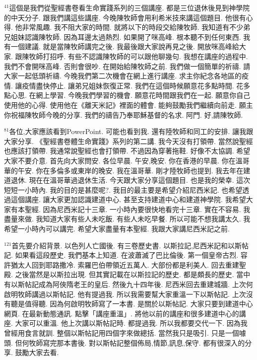 \documentclass{book}
\begin{document}
$^{41}$這個是我們從聖經書卷看生命實踐系列的三個講座.
都是三位退休後見到神學院的中天分子.
跟我們講這些講座.
今晚陳牧師會用利希米技來講這個題目.
他很有心得.
他非常風趣.
我不阻大家的時間.
就將以下的時段交給陳牧師.
我知道有不少弟兄姐妹認識陳牧師.
因為耳邊太過熱烈.
如果開了咪高峰.
根本聽不到任何東西.
我有一個建議.
就是當陳牧師講完之後.
我最後跟大家說再見之後.
開放咪高峰給大家.
跟陳牧師打招呼.
有些不認識陳牧師的可以跟他聊幾句.
我想在講座的過程中.
我們不會開咪高峰.
否則會很吵.
在開始給陳牧師之前.
我們做一個簡單的祈禱.
請大家一起低頭祈禱.
今晚我們第二次機會在網上進行講座.
求主你紀念各地區的疫情.
讓疫情盡快停止.
讓弟兄姐妹恢復正常.
我們在這個時候願意花多點時間.
花多點心思.
在網上學習.
今晚我們學習的機會.
願意花時間跟我們在一起.
願意你自己使用他的心得.
使用他在《離天米記》裡面的體會.
能夠鼓勵我們繼續向前走.
願主你祝福陳牧師今晚的分享.
我們的禱告乃奉耶穌基督的名求.
阿門.
好,請陳牧師.

$^{81}$各位,大家應該看到PowerPoint.
可能也看到我.
還有陸牧師和同工的安排.
讓我跟大家分享.
《聖經書卷體生命實踐》系列的第二講.
我今天沒有打領帶.
當然說聖經也應該打領帶.
我通常說聖經也會打領帶.
不過因為穿著拖鞋.
好像不太協調.
希望大家不要介意.
首先向大家問安.
各位早晨.
午安,晚安.
你在香港的早晨.
你在溫哥華的午安.
你在多倫多或東岸的晚安.
我在溫哥華.
剛才陸牧師也提到.
我去年在建道退休.
現在在溫哥華過退休生活.
今天跟大家分享這個題目.
也是我的榮幸.
這次短短一小時內.
我的目的是甚麼呢?.
我目的最主要是希望介紹尼西米記.
也希望透過這個講座.
讓大家更加認識建道中心.
甚至支持建道中心和建道神學院.
我希望大家有本聖經.
因為尼西米記十三章.
一小時內要很快地看完十三章.
實在不容易.
我盡量來做.
我知道大家有些人未吃飯.
有些人未吃早餐.
所以可能不想我講太久.
我希望一小時內可以講完.
希望大家盡量有本聖經.
我跟大家講尼西米記之前.

$^{121}$首先要介紹背景.
以色列人亡國後.
有三卷歷史書.
以斯拉記,尼西米記和以斯帖記.
如果看這段歷史.
我們基本上知道.
在波蕭滅了巴比倫後.
第一個皇帝古烈.
容許猶太人回到耶路撒冷.
索羅巴伯帶領近五萬人.
大部份都是利美人.
回去重建聖殿.
之後當然是以斯拉出現.
但其實記載在以斯拉記的歷史.
都是頗長的歷史.
當中有以斯帖記成為阿俠隋老王的皇后.
然後九十四年後.
尼西米回去重建城牆.
上次何啟明牧師講過以斯帖記.
他有提過我.
所以我需要幫大家重溫一下以斯帖記.
上次沒有聽是值得聽.
因為何啟明牧師寫了一本書.
是關於以斯帖記.
大家只要到建道中心網頁.
在最新動態通訊.
點擊「講座重溫」.
將他以前的講座和很多建道中心的講座.
大家可以重溫.
他上次講以斯帖記時.
都提過我.
所以我都要交代一下.
因為我曾經用食言就訓.
整個以斯帖記用四個字來做總括.
當然我只是吸引.
只是一個噱頭.
但何牧師寫完那本書後.
對以斯帖記整個佈局,情節,訊息,保守.
都有很深入的分享.
鼓勵大家去看.
\end{document}
